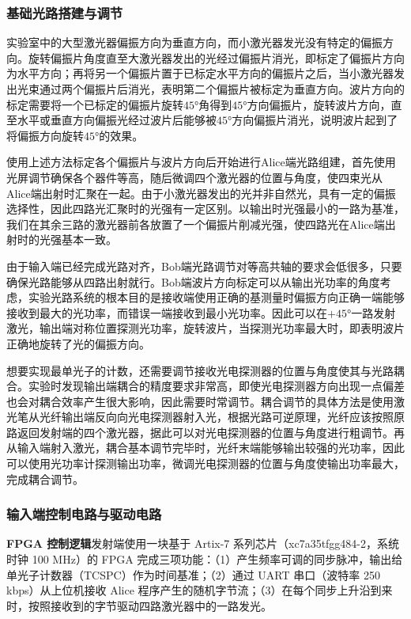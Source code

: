 \documentclass[UTF8]{ctexart}
\begin{document}
\subsubsection{基础光路搭建与调节}

实验室中的大型激光器偏振方向为垂直方向，而小激光器发光没有特定的偏振方向。旋转偏振片角度直至大激光器发出的光经过偏振片消光，即标定了偏振片方向为水平方向；再将另一个偏振片置于已标定水平方向的偏振片之后，当小激光器发出光束通过两个偏振片后消光，表明第二个偏振片被标定为垂直方向。波片方向的标定需要将一个已标定的偏振片旋转$\ang{45}$角得到$\ang{45}$方向偏振片，旋转波片方向，直至水平或垂直方向偏振光经过波片后能够被$\ang{45}$方向偏振片消光，说明波片起到了将偏振方向旋转$\ang{45}$的效果。

使用上述方法标定各个偏振片与波片方向后开始进行Alice端光路组建，首先使用光屏调节确保各个器件等高，随后微调四个激光器的位置与角度，使四束光从Alice端出射时汇聚在一起。由于小激光器发出的光并非自然光，具有一定的偏振选择性，因此四路光汇聚时的光强有一定区别。以输出时光强最小的一路为基准，我们在其余三路的激光器前各放置了一个偏振片削减光强，使四路光在Alice端出射时的光强基本一致。

由于输入端已经完成光路对齐，Bob端光路调节对等高共轴的要求会低很多，只要确保光路能够从四路出射就行。Bob端波片方向标定可以从输出光功率的角度考虑，实验光路系统的根本目的是接收端使用正确的基测量时偏振方向正确一端能够接收到最大的光功率，而错误一端接收到最小光功率。因此可以在$+\ang{45}$一路发射激光，输出端对称位置探测光功率，旋转波片，当探测光功率最大时，即表明波片正确地旋转了光的偏振方向。

想要实现最单光子的计数，还需要调节接收光电探测器的位置与角度使其与光路耦合。实验时发现输出端耦合的精度要求非常高，即使光电探测器方向出现一点偏差也会对耦合效率产生很大影响，因此需要时常调节。耦合调节的具体方法是使用激光笔从光纤输出端反向向光电探测器射入光，根据光路可逆原理，光纤应该按照原路返回发射端的四个激光器，据此可以对光电探测器的位置与角度进行粗调节。再从输入端射入激光，耦合基本调节完毕时，光纤末端能够输出较强的光功率，因此可以使用光功率计探测输出功率，微调光电探测器的位置与角度使输出功率最大，完成耦合调节。

\subsubsection{输入端控制电路与驱动电路}

\textbf{FPGA 控制逻辑}\quad 发射端使用一块基于 Artix-7 系列芯片（xc7a35tfgg484-2，系统时钟 100 MHz）的 FPGA 完成三项功能：（1）产生频率可调的同步脉冲，输出给单光子计数器（TCSPC）作为时间基准；（2）通过 UART 串口（波特率 250 kbps）从上位机接收 Alice 程序产生的随机字节流；（3）在每个同步上升沿到来时，按照接收到的字节驱动四路激光器中的一路发光。
\end{document}
